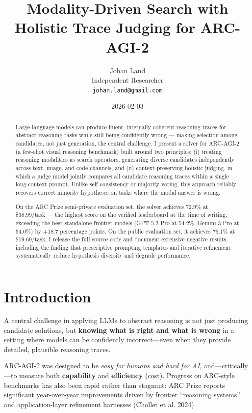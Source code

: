 \documentclass[11pt]{article}
\title{Modality-Driven Search with Holistic Trace Judging for ARC-AGI-2}
\author{Johan
Land \\ Independent Researcher \\ \texttt{johan.land@gmail.com}}
\date{2026-02-03}
\begin{document}
\maketitle

\begin{abstract}
Large language models can produce fluent, internally coherent reasoning
traces for abstract reasoning tasks while still being confidently wrong
--- making selection among candidates, not just generation, the central
challenge. I present a solver for ARC-AGI-2 (a few-shot visual reasoning
benchmark) built around two principles: (i) treating reasoning
modalities as search operators, generating diverse candidates
independently across text, image, and code channels, and (ii)
context-preserving holistic judging, in which a judge model jointly
compares all candidate reasoning traces within a single long-context
prompt. Unlike self-consistency or majority voting, this approach
reliably recovers correct minority hypotheses on tasks where the modal
answer is wrong.

On the ARC Prize semi-private evaluation set, the solver achieves 72.9\%
at \$38.99/task --- the highest score on the verified leaderboard at the
time of writing, exceeding the best standalone frontier models (GPT-5.2
Pro at 54.2\%, Gemini 3 Pro at 54.0\%) by +18.7 percentage points. On
the public evaluation set, it achieves 76.1\% at \$19.69/task. I release
the full source code and document extensive negative results, including
the finding that prescriptive prompting templates and iterative
refinement systematically reduce hypothesis diversity and degrade
performance.
\end{abstract}

\hypertarget{introduction}{%
\section{Introduction}\label{introduction}}

A central challenge in applying LLMs to abstract reasoning is not just
producing candidate solutions, but \textbf{knowing what is right and
what is wrong} in a setting where models can be confidently
incorrect---even when they provide detailed, plausible reasoning traces.

ARC-AGI-2 was designed to be \emph{easy for humans and hard for AI},
and---critically---to measure both \textbf{capability} and
\textbf{efficiency} (cost). Progress on ARC-style benchmarks has also
been rapid rather than stagnant: ARC Prize reports significant
year-over-year improvements driven by frontier ``reasoning systems'' and
application-layer refinement harnesses (Chollet et al. 2024).
\end{document}
